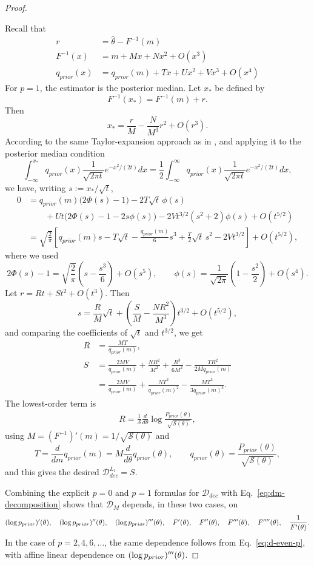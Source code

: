 \begin{proof}
\begin{itemize}
    Recall that
    \begin{align*}
        r &= \widehat{\theta} - F^{-1}(m)\\
        F^{-1}(x) &= m + Mx + Nx^2 + O(x^3)\\
        q_{prior}(x) &= q_{prior}(m) + Tx + Ux^2 + Vx^3 + O(x^4)
    \end{align*}
For \(p=1\), the estimator is the posterior median. Let \(x_\ast\) be defined by
\[
F^{-1}(x_\ast)=F^{-1}(m)+r.
\]
Then
\[
x_\ast = \frac{r}{M} - \frac{N}{M^3}r^2 + O(r^3).
\]
According to the same Taylor-expansion approach as in \citet{hahn2024unifying}, and applying it to the posterior median condition
\[
\int_{-\infty}^{x_\ast} q_{prior}(x)\frac{1}{\sqrt{2\pi t}}e^{-x^2/(2t)}dx
=
\frac12\int_{-\infty}^{\infty} q_{prior}(x)\frac{1}{\sqrt{2\pi t}}e^{-x^2/(2t)}dx,
\]
we have, writing \(s:=x_\ast/\sqrt{t}\),
\begin{align*}
0
&=
q_{prior}(m)\bigl(2\Phi(s)-1\bigr)-2T\sqrt{t}\,\phi(s)\\
&\qquad + Ut\bigl(2\Phi(s)-1-2s\phi(s)\bigr)-2Vt^{3/2}(s^2+2)\phi(s)+O(t^{5/2})\\
&=
\sqrt{\frac{2}{\pi}}
\left[
q_{prior}(m)s
-T\sqrt{t}
-\frac{q_{prior}(m)}{6}s^3
+\frac{T}{2}\sqrt{t}\,s^2
-2Vt^{3/2}
\right]
+O(t^{5/2}),
\end{align*}
where we used
\[
2\Phi(s)-1=\sqrt{\frac{2}{\pi}}\left(s-\frac{s^3}{6}\right)+O(s^5),
\qquad
\phi(s)=\frac{1}{\sqrt{2\pi}}\left(1-\frac{s^2}{2}\right)+O(s^4).
\]
Let \(r = Rt + St^2 + O(t^3)\). Then
\[
s=\frac{R}{M}\sqrt{t}
+\left(\frac{S}{M}-\frac{NR^2}{M^3}\right)t^{3/2}
+O(t^{5/2}),
\]
and comparing the coefficients of \(\sqrt{t}\) and \(t^{3/2}\), we get
\begin{align*}
R &= \frac{MT}{q_{prior}(m)},\\
S &= \frac{2MV}{q_{prior}(m)} + \frac{NR^2}{M^2} + \frac{R^3}{6M^2} - \frac{TR^2}{2Mq_{prior}(m)}\\
&= \frac{2MV}{q_{prior}(m)} + \frac{NT^2}{q_{prior}(m)^2} - \frac{MT^3}{3q_{prior}(m)^3}.
\end{align*}
The lowest-order term is
\begin{align*}
R
= \frac{1}{\mathcal{S}}\frac{d}{d \theta} \log \frac{P_{prior}(\theta)}{\sqrt{\mathcal{S}(\theta)}},
\end{align*}
using \(M=(F^{-1})'(m)=1/\sqrt{\mathcal S(\theta)}\) and
\[
T = \frac{d}{dm}q_{prior}(m) = M\frac{d}{d\theta}q_{prior}(\theta),
\qquad
q_{prior}(\theta)=\frac{P_{prior}(\theta)}{\sqrt{\mathcal S(\theta)}},
\]
and this gives the desired \(\mathcal D_{dec}^{L_1}=S\).
\end{itemize}
Combining the explicit \(p=0\) and \(p=1\) formulas for \(\mathcal D_{dec}\) with Eq.~\ref{eq:dm-decomposition} shows that \(\mathcal D_M\) depends, in these two cases, on
\[
(\log p_{prior})'(\theta),\quad (\log p_{prior})''(\theta),\quad (\log p_{prior})'''(\theta),\quad F'(\theta),\quad F''(\theta),\quad F'''(\theta),\quad F''''(\theta),\quad \frac1{F'(\theta)}.
\]
In the case of $p=2,4,6,\dots$, the same dependence follows from Eq.~\ref{eq:d-even-p}, with affine linear dependence on \((\log p_{prior})'''(\theta)\).
\end{proof}



